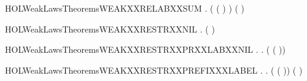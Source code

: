 \newcommand{\HOLWeakLawsTheoremsWEAKXXRELABXXPREFIX}{\UseVerbatim{HOLWeakLawsTheoremsWEAKXXRELABXXPREFIX}}
\begin{SaveVerbatim}{HOLWeakLawsTheoremsWEAKXXRELABXXSUM}
\HOLTokenTurnstile{} \HOLSymConst{\HOLTokenForall{}}  .
        ( ( \HOLSymConst{\ensuremath{+}} ) ) (   \HOLSymConst{\ensuremath{+}}   )
\end{SaveVerbatim}
\newcommand{\HOLWeakLawsTheoremsWEAKXXRELABXXSUM}{\UseVerbatim{HOLWeakLawsTheoremsWEAKXXRELABXXSUM}}
\begin{SaveVerbatim}{HOLWeakLawsTheoremsWEAKXXRESTRXXNIL}
\HOLTokenTurnstile{} \HOLSymConst{\HOLTokenForall{}}.  (\HOLConst{\ensuremath{\nu}}  ) 
\end{SaveVerbatim}
\newcommand{\HOLWeakLawsTheoremsWEAKXXRESTRXXNIL}{\UseVerbatim{HOLWeakLawsTheoremsWEAKXXRESTRXXNIL}}
\begin{SaveVerbatim}{HOLWeakLawsTheoremsWEAKXXRESTRXXPRXXLABXXNIL}
\HOLTokenTurnstile{} \HOLSymConst{\HOLTokenForall{}} .
        \HOLConst{\HOLTokenIn{}}  \HOLSymConst{\HOLTokenDisj{}}   \HOLConst{\HOLTokenIn{}}  \HOLSymConst{\HOLTokenImp{}}
       \HOLSymConst{\HOLTokenForall{}}.  (\HOLConst{\ensuremath{\nu}}  ( )) 
\end{SaveVerbatim}
\newcommand{\HOLWeakLawsTheoremsWEAKXXRESTRXXPRXXLABXXNIL}{\UseVerbatim{HOLWeakLawsTheoremsWEAKXXRESTRXXPRXXLABXXNIL}}
\begin{SaveVerbatim}{HOLWeakLawsTheoremsWEAKXXRESTRXXPREFIXXXLABEL}
\HOLTokenTurnstile{} \HOLSymConst{\HOLTokenForall{}} .
        \HOLConst{\HOLTokenNotIn{}}  \HOLSymConst{\HOLTokenConj{}}   \HOLConst{\HOLTokenNotIn{}}  \HOLSymConst{\HOLTokenImp{}}
       \HOLSymConst{\HOLTokenForall{}}.  (\HOLConst{\ensuremath{\nu}}  ( )) ( \HOLConst{\ensuremath{\nu}}  )
\end{SaveVerbatim}
